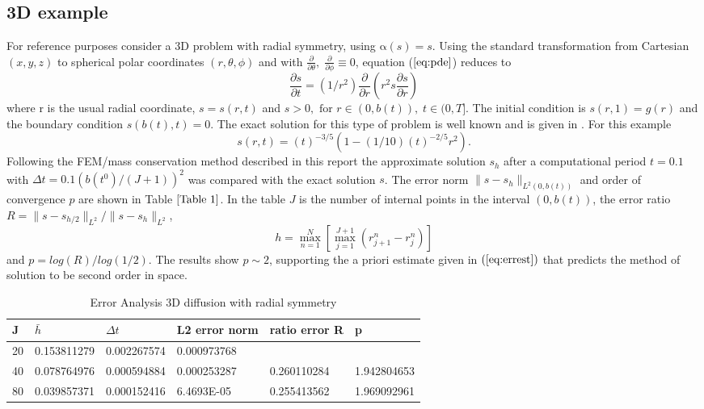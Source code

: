 \documentclass[11pt]{article}
\newcommand{\pl}{\partial}
\newcommand{\D}{\Delta}
\newcommand{\al}{\mathrm{\alpha}}
\begin{document}
\subsection{3D example }
For reference purposes consider a 3D problem with radial symmetry, using $\al(s) = s$. Using the standard transformation from Cartesian $(x,y,z)$ to spherical polar coordinates $(r,\theta, \phi)$ and with $\frac{\pl}{\pl{\theta}},\;\frac{\pl}{\pl{\phi}}\equiv 0$, equation ($\ref{eq:pde}$) reduces to
\begin{equation}
\label{eq:pde1}
\frac{\partial{s}}{\partial{t}} = (1/r^2)\frac{\pl}{\pl{r}}\left(r^2s\frac{\pl{s}}{\pl{r}}\right) 
\end{equation}
where r is the usual radial coordinate, $s =s(r,t)$ and $s >0, \text{ for } r \in (0,b(t)), \;t\in(0,T]$. The initial condition is $s(r,1) = g(r)$ and the boundary condition $s(b(t),t)=0$. 
The exact solution for this type of problem is well known and is given in \cite{Baines2006}. For this example $$ s(r,t) =(t)^{-3/5}\left(1 - (1/10)(t)^{-2/5}r^{2}\right).$$
Following the FEM/mass conservation method described in this report the approximate solution $s_h$ after a computational period $t=0.1$ with $\D{t} = 0.1(b(t^0)/(J+1))^2$ was compared with the exact solution $s$. The error norm $\|s-s_h\|_{L^{2}(0,b(t))}$ and order of convergence $p$ are shown in Table $\ref{Table 1}$. In the table $J$ is the number of internal points in the interval $(0,b(t))$, the error ratio $R = \|s-s_{h/2}\|_{L^2}/\|s-s_h\|_{L^2}$, 
$$h = \max_{n=1}^N\left[\max_{j=1}^{J+1}{(r_{j+1}^n - r_j^n)}\right]$$ and $p = log(R)/log(1/2)$. The results show $p\sim 2$, supporting the a priori estimate given in $(\ref{eq:errest})$ that predicts the method of solution to be second order in space.

\begin{table}[]
\centering
\caption{Error Analysis 3D diffusion with radial symmetry}
\label{Table 1}
\begin{tabular}{|l|l|l|l|l|l|}
\hline
J	&$\bar{h}$	&$\D{t}$	&L2 error norm	&ratio error R	&p \\ \hline
20	&0.153811279	&0.002267574	&0.000973768	& &	\\ \hline
40	&0.078764976	&0.000594884	&0.000253287	&0.260110284	&1.942804653 \\ \hline
80	&0.039857371	&0.000152416	&6.4693E-05	&0.255413562	&1.969092961 \\ \hline
\end{tabular}
\end{table}
\end{document}
